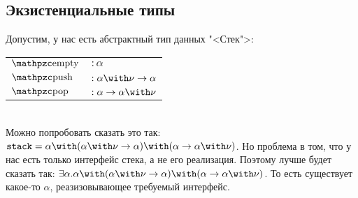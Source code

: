\subsection*{\texorpdfstring{Экзистенциальные типы}{Existential types}}

\todo
Допустим, у нас есть абстрактный тип данных "<Стек">: \\
\begin{tabular}{l l}
    $\comb{empty}$ & $: \alpha$ \\
    $\comb{push}$  & $: \alpha\with\nu\rightarrow\alpha$ \\
    $\comb{pop}$   & $: \alpha\rightarrow\alpha\with\nu$ \\
\end{tabular} \\
Можно попробовать сказать это так: $\mathtt{stack} =
    \alpha \with (\alpha\with\nu\rightarrow\alpha) \with (\alpha\rightarrow\alpha\with\nu)$.
Но проблема в том, что у нас есть только интерфейс стека, а не его реализация. Поэтому лучше будет сказать так:
    $\exists \alpha . \alpha \with (\alpha\with\nu\rightarrow\alpha) \with (\alpha\rightarrow\alpha\with\nu)$.
То есть существует какое-то $\alpha$, реазизовывающее требуемый интерфейс.
\todo 

\ 

